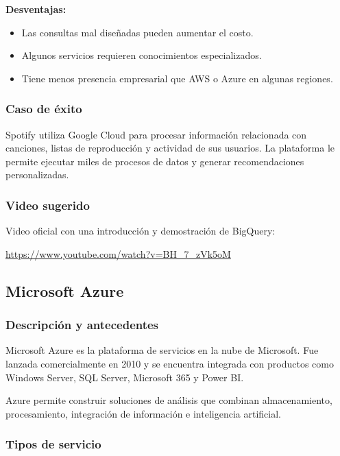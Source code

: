 \textbf{Desventajas:}

\begin{itemize}
    \item Las consultas mal diseñadas pueden aumentar el costo.
    \item Algunos servicios requieren conocimientos especializados.
    \item Tiene menos presencia empresarial que AWS o Azure en algunas regiones.
\end{itemize}

\subsubsection*{Caso de éxito}

Spotify utiliza Google Cloud para procesar información relacionada con
canciones, listas de reproducción y actividad de sus usuarios. La plataforma
le permite ejecutar miles de procesos de datos y generar recomendaciones
personalizadas.

\subsubsection*{Video sugerido}

Video oficial con una introducción y demostración de BigQuery:

\url{https://www.youtube.com/watch?v=BH_7_zVk5oM}


\subsection{Microsoft Azure}

\subsubsection*{Descripción y antecedentes}

Microsoft Azure es la plataforma de servicios en la nube de Microsoft. Fue
lanzada comercialmente en 2010 y se encuentra integrada con productos como
Windows Server, SQL Server, Microsoft 365 y Power BI.

Azure permite construir soluciones de análisis que combinan almacenamiento,
procesamiento, integración de información e inteligencia artificial.

\subsubsection*{Tipos de servicio}

